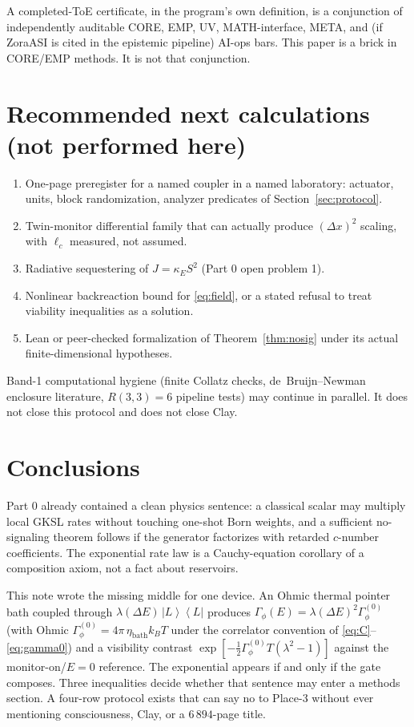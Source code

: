 \documentclass[11pt]{article}
\theoremstyle{definition}
\theoremstyle{plain}
\newcommand{\ket}[1]{\left|{#1}\right\rangle}
\newcommand{\bra}[1]{\left\langle{#1}\right|}
\newcommand{\LR}{\ket{L}\!\bra{L}}
\begin{document}
A completed-ToE certificate, in the program's own definition, is a conjunction of independently
auditable CORE, EMP, UV, MATH-interface, META, and (if ZoraASI is cited in the epistemic
pipeline) AI-ops bars.\cite{status} This paper is a brick in CORE/EMP methods. It is not that
conjunction.

\section{Recommended next calculations (not performed here)}

\begin{enumerate}
\item One-page preregister for a named coupler in a named laboratory: actuator, units, block
randomization, analyzer predicates of Section~\ref{sec:protocol}.
\item Twin-monitor differential family that can actually produce $(\Delta x)^2$ scaling, with $\ell_c$
measured, not assumed.
\item Radiative sequestering of $J = \kappa_E S^2$ (Part 0 open problem 1).
\item Nonlinear backreaction bound for \eqref{eq:field}, or a stated refusal to treat viability
inequalities as a solution.
\item Lean or peer-checked formalization of Theorem~\ref{thm:nosig} under its actual
finite-dimensional hypotheses.
\end{enumerate}
Band-1 computational hygiene (finite Collatz checks, de~Bruijn--Newman enclosure literature,
$R(3,3)=6$ pipeline tests) may continue in parallel. It does not close this protocol and does not
close Clay.\cite{status}

\section{Conclusions}

Part 0 already contained a clean physics sentence: a classical scalar may multiply local GKSL
rates without touching one-shot Born weights, and a sufficient no-signaling theorem follows
if the generator factorizes with retarded $c$-number coefficients. The exponential rate law is a
Cauchy-equation corollary of a composition axiom, not a fact about reservoirs.

This note wrote the missing middle for one device. An Ohmic thermal pointer bath coupled
through $\lambda(\Delta E)\,\LR$ produces $\Gamma_\phi(E) = \lambda(\Delta E)^2 \Gamma_\phi^{(0)}$ (with
Ohmic $\Gamma_\phi^{(0)} = 4\pi\,\eta_{\mathrm{bath}} k_B T$ under the correlator convention of
\eqref{eq:C}--\eqref{eq:gamma0}) and a visibility contrast
$\exp[-\tfrac12 \Gamma_\phi^{(0)}T(\lambda^2 - 1)]$ against the monitor-on/$E{=}0$ reference. The
exponential appears if and only if the gate composes. Three inequalities decide whether that
sentence may enter a methods section. A four-row protocol exists that can say no to Place-3
without ever mentioning consciousness, Clay, or a $6\,894$-page title.
\end{document}
